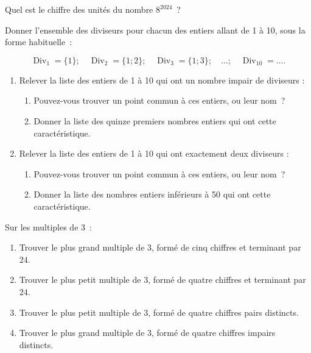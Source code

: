 \documentclass[a4paper,12pt]{report}
\begin{document}
\vspace*{-2\baselineskip}

\begin{acti}
Quel est le chiffre des unités du nombre $8^{2024}$~? %
\end{acti}

\begin{acti}
Donner l'ensemble des diviseurs pour chacun des entiers allant de 1 à 10, sous la forme habituelle~: 

\[\operatorname{Div}_1=\{1\} ;\quad \operatorname{Div}_2=\{1 ; 2\} ;\quad \operatorname{Div}_3=\{1 ; 3\} ;\quad \ldots ;\quad \operatorname{Div}_{10}=\ldots.\]
\begin{enumerate}
\item Relever la liste des entiers de 1 à 10 qui ont un nombre impair de diviseurs :
\begin{enumerate}
\item Pouvez-vous trouver un point commun à ces entiers, ou leur nom~?
\item Donner la liste des quinze premiers nombres entiers qui ont cette caractéristique.
\end{enumerate}
\item Relever la liste des entiers de 1 à 10 qui ont exactement deux diviseurs :
\begin{enumerate}
\item Pouvez-vous trouver un point commun à ces entiers, ou leur nom~?
\item Donner la liste des nombres entiers inférieurs à 50 qui ont cette caractéristique.
\end{enumerate}
\end{enumerate}
\end{acti}



\begin{exo}
Sur les multiples de $3$~:
\begin{enumerate}
\item Trouver le plus grand multiple de $3$, formé de cinq chiffres et terminant par $24$.
\item Trouver le plus petit multiple de $3$, formé de quatre chiffres et terminant par $24$.
\item Trouver le plus petit multiple de $3$, formé de quatre chiffres pairs distincts.
\item Trouver le plus grand multiple de $3$, formé de quatre chiffres impairs distincts.
\end{enumerate}
\end{exo}
\end{document}
